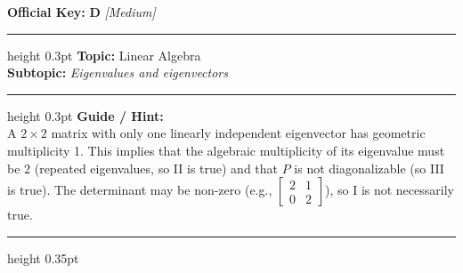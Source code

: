 \documentclass[a4paper,10pt]{article}
\begin{document}
\begin{tcolorbox}
\tcblower

\textbf{Official Key:} \textbf{\large D} \hfill \textit{\small [Medium]}
\vspace{2pt}\hrule height 0.3pt\vspace{3pt}
\textbf{Topic:} Linear Algebra \\
\textbf{Subtopic:} \textit{Eigenvalues and eigenvectors}
\vspace{2pt}\hrule height 0.3pt\vspace{3pt}
\textbf{Guide / Hint:} \\
{\small A $2 \times 2$ matrix with only one linearly independent eigenvector has geometric multiplicity 1. This implies that the algebraic multiplicity of its eigenvalue must be 2 (repeated eigenvalues, so II is true) and that $P$ is not diagonalizable (so III is true). The determinant may be non-zero (e.g., $\begin{bmatrix} 2 & 1 \\ 0 & 2 \end{bmatrix}$), so I is not necessarily true.}

\end{tcolorbox}
\vspace{6pt}\hrule height 0.35pt\vspace{6pt}
\noindent
\end{document}
